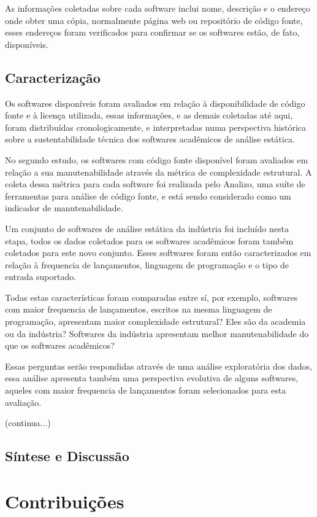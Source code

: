 As informações coletadas sobre cada software inclui nome, descrição e o
endereço onde obter uma cópia, normalmente página web ou repositório de código
fonte, esses endereços foram verificados para confirmar se os softwares estão,
de fato, disponíveis.

\subsection{Caracterização}
Os softwares disponíveis foram avaliados em relação à disponibilidade de código
fonte e à licença utilizada, essas informações, e as demais coletadas até aqui,
foram distribuídas cronologicamente, e interpretadas numa perspectiva histórica
sobre a sustentabilidade técnica dos softwares acadêmicos de análise estática.

No segundo estudo, os softwares com código fonte disponível foram avaliados em
relação a sua manutenabilidade através da métrica de complexidade estrutural. A
coleta dessa métrica para cada software foi realizada pelo Analizo, uma suíte
de ferramentas para análise de código fonte, e está sendo considerado como um
indicador de manutenabilidade.

Um conjunto de softwares de análise estática da indústria foi incluído nesta
etapa, todos os dados coletados para os softwares acadêmicos foram também
coletados para este novo conjunto. Esses softwares foram então caracterizados em
relação à frequencia de lançamentos, linguagem de programação e o tipo de
entrada suportado.

Todas estas características foram comparadas entre sí, por exemplo, softwares
com maior frequencia de lançamentos, escritos na mesma linguagem de
programação, apresentam maior complexidade estrutural? Eles são da academia ou
da indústria? Softwares da indústria apresentam melhor manutenabilidade do que
os softwares acadêmicos?

Essas perguntas serão respondidas através de uma análise exploratória dos
dados, essa análise apresenta também uma perspectiva evolutiva de alguns
softwares, aqueles com maior frequencia de lançamentos foram selecionados para
esta avaliação.

(continua...)

\subsection{Síntese e Discussão}


\section{Contribuições}

